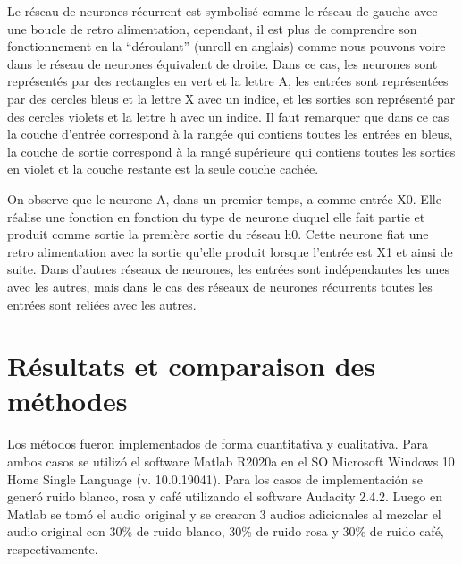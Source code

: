 \documentclass[conference,onecolumn]{IEEEtran}
\begin{document}

Le réseau de neurones récurrent est symbolisé comme le réseau de gauche avec une boucle de retro alimentation, cependant, il est plus de comprendre son fonctionnement en la “déroulant” (unroll en anglais) comme nous pouvons voire dans le réseau de neurones équivalent de droite. Dans ce cas, les neurones sont représentés par des rectangles en vert et la lettre A, les entrées sont représentées par des cercles bleus et la lettre X avec un indice, et les sorties son représenté par des cercles violets et la lettre h avec un indice. Il faut remarquer que dans ce cas la couche d’entrée correspond à la rangée qui contiens toutes les entrées en bleus, la couche de sortie correspond à la rangé supérieure qui contiens toutes les sorties en violet et la couche restante est la seule couche cachée. 

On observe que le neurone A, dans un premier temps, a comme entrée X0. Elle réalise une fonction en fonction du type de neurone duquel elle fait partie et produit comme sortie la première sortie du réseau h0.  Cette neurone fiat une retro alimentation avec la sortie qu’elle produit lorsque l’entrée est X1 et ainsi de suite. Dans d’autres réseaux de neurones, les entrées sont indépendantes les unes avec les autres, mais dans le cas des réseaux de neurones récurrents toutes les entrées sont reliées avec les autres. 




\clearpage %
\section{Résultats et comparaison des méthodes}
Los métodos fueron implementados de forma cuantitativa y cualitativa. Para ambos casos se utilizó el software Matlab R2020a en el SO Microsoft Windows 10 Home Single Language (v. 10.0.19041). Para los casos de implementación se generó ruido blanco, rosa y café utilizando el software Audacity 2.4.2. Luego en Matlab se tomó el audio original y se crearon 3 audios adicionales al mezclar el audio original con 30\% de ruido blanco, 30\% de ruido rosa y 30\% de ruido café, respectivamente.
\end{document}
